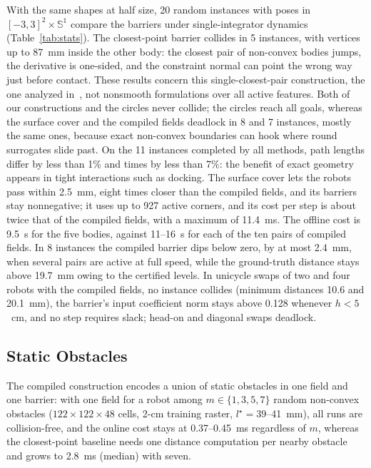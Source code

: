 \documentclass[journal]{IEEEtran}
\theoremstyle{definition}
\newcommand{\Sone}{\mathbb{S}^1}
\begin{document}
With the same shapes at half size, 20 random instances with poses in $[-3,3]^2\times\Sone$ compare
the barriers under single-integrator dynamics (Table~\ref{tab:stats}). The closest-point barrier
collides in 5 instances, with vertices up to 87~mm inside the other body: the closest pair of
non-convex bodies jumps, the derivative is one-sided, and the constraint normal can point the wrong
way just before contact. These results concern this single-closest-pair construction, the one
analyzed in~\cite{jo2026geometry}, not nonsmooth formulations over all active features. Both of our
constructions and the circles never collide; the circles reach all goals, whereas the surface cover
and the compiled fields deadlock in 8 and 7 instances, mostly the same ones, because exact
non-convex boundaries can hook where round surrogates slide past. On the 11 instances completed by all
methods, path lengths differ by less than 1\% and times by less than 7\%: the benefit of exact
geometry appears in tight interactions such as docking. The surface cover lets the robots pass
within 2.5~mm, eight times closer than the compiled fields, and its barriers stay nonnegative; it
uses up to 927 active corners, and its cost per step is about twice that of the compiled fields, with
a maximum of 11.4~ms. The offline cost is 9.5~s for the five bodies, against 11--16~s for each of the
ten pairs of compiled fields. In 8 instances the compiled barrier dips below zero, by at
most 2.4~mm, when several pairs are active at full speed, while the ground-truth distance stays
above 19.7~mm owing to the certified levels. In unicycle swaps of two and four robots with the
compiled fields, no instance
collides (minimum distances 10.6 and 20.1~mm), the barrier's input coefficient norm stays above 0.128
whenever $h<5$~cm, and no step requires slack; head-on and diagonal swaps deadlock.

\subsection{Static Obstacles}\label{sec:exp-static}
The compiled construction encodes a union of static obstacles in one field and one barrier: with one
field for a robot among $m\in\{1,3,5,7\}$ random non-convex obstacles
($122\times122\times48$ cells, 2-cm training raster, $l^\star=39$--41~mm), all runs are
collision-free, and the online cost stays at 0.37--0.45~ms regardless of $m$, whereas the
closest-point baseline needs one distance computation per nearby obstacle and grows to 2.8~ms
(median) with seven.
\end{document}
